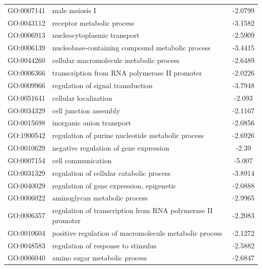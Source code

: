 \documentclass[11pt,twoside,a4paper]{report}
\begin{document}
\begin{appendices}
\begin{longtable}{@{\extracolsep{\fill}}llc@{}}
    GO:0007141 & male meiosis I                                              & -2.0799       \\
    GO:0043112 & receptor metabolic process                                  & -3.1582       \\
    GO:0006913 & nucleocytoplasmic transport                                 & -2.5909       \\
    GO:0006139 & nucleobase-containing compound metabolic process            & -3.4415       \\
    GO:0044260 & cellular macromolecule metabolic process                    & -2.6489       \\
    GO:0006366 & transcription from RNA polymerase II promoter               & -2.0226       \\
    GO:0009966 & regulation of signal transduction                           & -3.7948       \\
    GO:0051641 & cellular localization                                       & -2.093        \\
    GO:0034329 & cell junction assembly                                      & -2.1167       \\
    GO:0015698 & inorganic anion transport                                   & -2.0856       \\
    GO:1900542 & regulation of purine nucleotide metabolic process           & -2.6926       \\
    GO:0010629 & negative regulation of gene expression                      & -2.39         \\
    GO:0007154 & cell communication                                          & -5.007        \\
    GO:0031329 & regulation of cellular catabolic process                    & -3.8914       \\
    GO:0040029 & regulation of gene expression, epigenetic                   & -2.0888       \\
    GO:0006022 & aminoglycan metabolic process                               & -2.9965       \\
    GO:0006357 & regulation of transcription from RNA polymerase II promoter & -2.2083       \\
    GO:0010604 & positive regulation of macromolecule metabolic process      & -2.1272       \\
    GO:0048583 & regulation of response to stimulus                          & -2.5882       \\
    GO:0006040 & amino sugar metabolic process                               & -2.6847       \\

\end{longtable}
\end{appendices}
\end{document}
